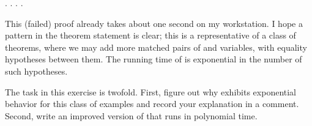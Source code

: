 \documentclass[12pt]{report}
\begin{document}
\begin{enumerate}
\begin{coqdoccode}
\coqdocindent{1.00em}
     \coqdoceol
\coqdocindent{1.00em}
   .\coqdoceol
\coqdocindent{1.00em}
.\coqdoceol
\coqdocindent{1.00em}
  .\coqdoceol
\coqdocnoindent
{}.\coqdoceol
\coqdocemptyline
\coqdocemptyline
\end{coqdoccode}
This (failed) proof already takes about one second on my workstation.  I hope a pattern in the theorem statement is clear; this is a representative of a class of theorems, where we may add more matched pairs of  and  variables, with equality hypotheses between them.  The running time of  is exponential in the number of such hypotheses.


   The task in this exercise is twofold.  First, figure out why  exhibits exponential behavior for this class of examples and record your explanation in a comment.  Second, write an improved version of  that runs in polynomial time.



\end{enumerate}
\end{document}
